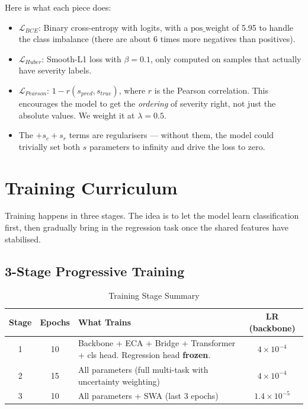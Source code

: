 \documentclass[12pt]{report}
\begin{document}
Here is what each piece does:
\begin{itemize}
    \item $\mathcal{L}_{BCE}$: Binary cross-entropy with logits, with a $\text{pos\_weight}$ of 5.95 to handle the class imbalance (there are about 6 times more negatives than positives).
    \item $\mathcal{L}_{Huber}$: Smooth-L1 loss with $\beta = 0.1$, only computed on samples that actually have severity labels.
    \item $\mathcal{L}_{Pearson}$: $1 - r(s_{pred}, s_{true})$, where $r$ is the Pearson correlation. This encourages the model to get the \textit{ordering} of severity right, not just the absolute values. We weight it at $\lambda = 0.5$.
    \item The $+s_c + s_r$ terms are regularisers --- without them, the model could trivially set both $s$ parameters to infinity and drive the loss to zero.
\end{itemize}

\section{Training Curriculum}

Training happens in three stages. The idea is to let the model learn classification first, then gradually bring in the regression task once the shared features have stabilised.

\subsection{3-Stage Progressive Training}
\begin{table}[H]
\centering
\caption{Training Stage Summary}
\label{tab:stages}
\renewcommand{\arraystretch}{1.2}
\begin{tabular}{|c|c|p{5.5cm}|c|}
\hline
\textbf{Stage} & \textbf{Epochs} & \textbf{What Trains} & \textbf{LR (backbone)} \\
\hline
1 & 10 & Backbone + ECA + Bridge + Transformer + cls head. Regression head \textbf{frozen}. & $4\times10^{-4}$ \\
2 & 15 & All parameters (full multi-task with uncertainty weighting) & $4\times10^{-4}$ \\
3 & 10 & All parameters + SWA (last 3 epochs) & $1.4\times10^{-5}$ \\
\hline
\end{tabular}
\end{table}
\end{document}
